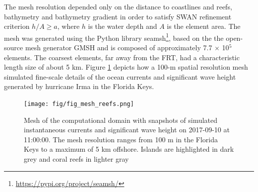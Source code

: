 \documentclass[11pt,a4paper]{article}
\begin{document}
The mesh resolution depended only on the distance to coastlines and reefs, bathymetry and bathymetry gradient in order to satisfy SWAN refinement criterion $h/A\geq a$, where $h$ is the water depth and $A$ is the element area. The mesh was generated using the Python library seamsh\footnote{\url{https://pypi.org/project/seamsh/}}, based on the the open-source mesh generator GMSH \citep{geuzaine2009gmsh} and is composed of approximately 7.7 $\times$ 10$^5$ elements. The coarsest elements, far away from the FRT, had a characteristic length size of about 5 km. Figure \ref{fig:mesh} depicts how a 100-m spatial resolution mesh simulated fine-scale details of the ocean currents and significant wave height generated by hurricane Irma in the Florida Keys.

\begin{figure}
    \centering
    \texttt{[image: fig/fig\_mesh\_reefs.png]}
    \caption{Mesh of the computational domain with snapshots of simulated instantaneous currents and significant wave height on 2017-09-10 at 11:00:00. The mesh resolution ranges from 100 m in the Florida Keys to a maximum of 5 km offshore. Islands are highlighted in dark grey and coral reefs in lighter gray}
    \label{fig:mesh}
\end{figure}
\end{document}
